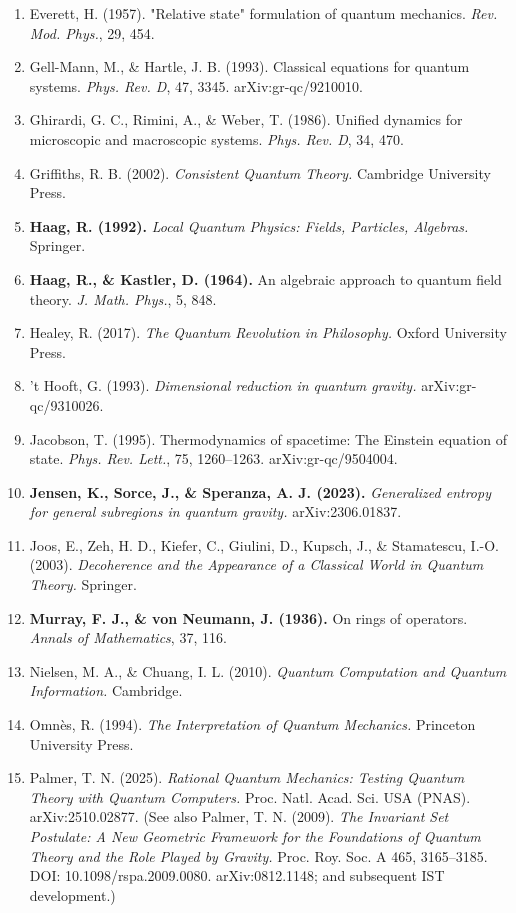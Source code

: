 \documentclass[11pt,a4paper]{article}
\begin{document}
\begin{enumerate}
  \item Everett, H. (1957). "Relative state" formulation of quantum mechanics. \emph{Rev. Mod. Phys.}, 29, 454.
  \item Gell-Mann, M., \& Hartle, J. B. (1993). Classical equations for quantum systems. \emph{Phys. Rev. D}, 47, 3345. arXiv:gr-qc/9210010.
  \item Ghirardi, G. C., Rimini, A., \& Weber, T. (1986). Unified dynamics for microscopic and macroscopic systems. \emph{Phys. Rev. D}, 34, 470.
  \item Griffiths, R. B. (2002). \emph{Consistent Quantum Theory.} Cambridge University Press.
  \item \textbf{Haag, R. (1992).} \emph{Local Quantum Physics: Fields, Particles, Algebras.} Springer.
  \item \textbf{Haag, R., \& Kastler, D. (1964).} An algebraic approach to quantum field theory. \emph{J. Math. Phys.}, 5, 848.
  \item Healey, R. (2017). \emph{The Quantum Revolution in Philosophy.} Oxford University Press.
  \item 't Hooft, G. (1993). \emph{Dimensional reduction in quantum gravity.} arXiv:gr-qc/9310026.
  \item Jacobson, T. (1995). Thermodynamics of spacetime: The Einstein equation of state. \emph{Phys. Rev. Lett.}, 75, 1260–1263. arXiv:gr-qc/9504004.
  \item \textbf{Jensen, K., Sorce, J., \& Speranza, A. J. (2023).} \emph{Generalized entropy for general subregions in quantum gravity.} arXiv:2306.01837.
  \item Joos, E., Zeh, H. D., Kiefer, C., Giulini, D., Kupsch, J., \& Stamatescu, I.-O. (2003). \emph{Decoherence and the Appearance of a Classical World in Quantum Theory.} Springer.
  \item \textbf{Murray, F. J., \& von Neumann, J. (1936).} On rings of operators. \emph{Annals of Mathematics}, 37, 116.
  \item Nielsen, M. A., \& Chuang, I. L. (2010). \emph{Quantum Computation and Quantum Information.} Cambridge.
  \item Omnès, R. (1994). \emph{The Interpretation of Quantum Mechanics.} Princeton University Press.
  \item Palmer, T. N. (2025). \emph{Rational Quantum Mechanics: Testing Quantum Theory with Quantum Computers.} Proc. Natl. Acad. Sci. USA (PNAS). arXiv:2510.02877. (See also Palmer, T. N. (2009). \emph{The Invariant Set Postulate: A New Geometric Framework for the Foundations of Quantum Theory and the Role Played by Gravity.} Proc. Roy. Soc. A 465, 3165–3185. DOI: 10.1098/rspa.2009.0080. arXiv:0812.1148; and subsequent IST development.)

\end{enumerate}
\end{document}
